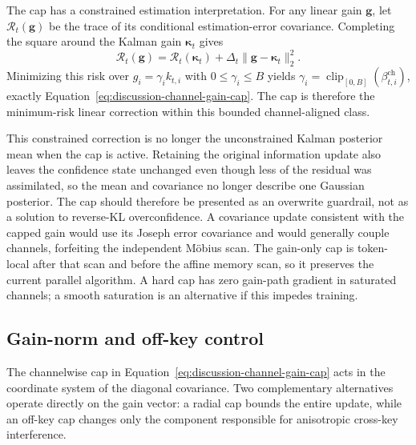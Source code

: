 \documentclass[11pt]{article}
\newcommand{\vct}[1]{\boldsymbol{#1}}
\begin{document}
The cap has a constrained estimation interpretation. For any linear gain $\vct{g}$, let
$\mathcal{R}_t(\vct{g})$ be the trace of its conditional estimation-error covariance. Completing
the square around the Kalman gain $\vct{\kappa}_t$ gives
\begin{equation}
  \mathcal{R}_t(\vct{g})
  =\mathcal{R}_t(\vct{\kappa}_t)
   +\Delta_t\|\vct{g}-\vct{\kappa}_t\|_2^2.
  \label{eq:discussion-capped-gain-risk}
\end{equation}
Minimizing this risk over
$g_i=\gamma_i k_{t,i}$ with $0\leq\gamma_i\leq B$ yields
$\gamma_i=\operatorname{clip}_{[0,B]}(\beta_{t,i}^{\mathrm{ch}})$, exactly
Equation~\eqref{eq:discussion-channel-gain-cap}. The cap is therefore the minimum-risk linear
correction within this bounded channel-aligned class.

This constrained correction is no longer the unconstrained Kalman posterior mean when the cap is
active. Retaining the original information update also leaves the confidence state unchanged even
though less of the residual was assimilated, so the mean and covariance no longer describe one
Gaussian posterior. The cap should therefore be presented as an overwrite guardrail, not as a
solution to reverse-KL overconfidence. A covariance update consistent with the capped gain would
use its Joseph error covariance and would generally couple channels, forfeiting the independent
M\"obius scan. The gain-only cap is token-local after that scan and before the affine memory scan,
so it preserves the current parallel algorithm. A hard cap has zero gain-path gradient in saturated
channels; a smooth saturation is an alternative if this impedes training.

\subsection{Gain-norm and off-key control}
\label{subsec:discussion-gain-norm-control}

The channelwise cap in Equation~\eqref{eq:discussion-channel-gain-cap} acts in the coordinate
system of the diagonal covariance. Two complementary alternatives operate directly on the gain
vector: a radial cap bounds the entire update, while an off-key cap changes only the component
responsible for anisotropic cross-key interference.
\end{document}
